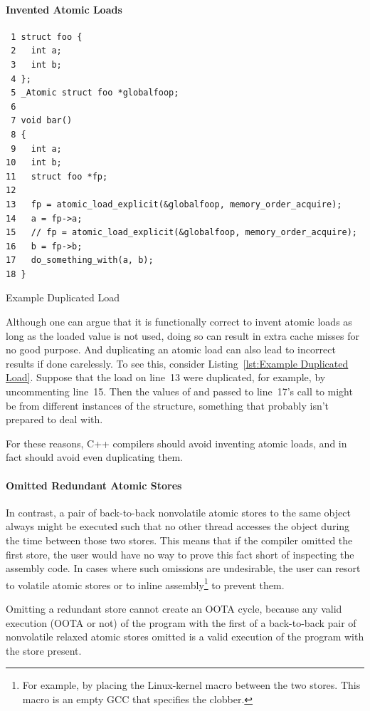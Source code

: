 \documentclass[10]{article}
\begin{document}
\paragraph{Invented Atomic Loads}
\begin{listing}[tbp]
\scriptsize
\begin{verbatim}
 1 struct foo {
 2   int a;
 3   int b;
 4 };
 5 _Atomic struct foo *globalfoop;
 6
 7 void bar()
 8 {
 9   int a;
10   int b;
11   struct foo *fp;
12
13   fp = atomic_load_explicit(&globalfoop, memory_order_acquire);
14   a = fp->a;
15   // fp = atomic_load_explicit(&globalfoop, memory_order_acquire);
16   b = fp->b;
17   do_something_with(a, b);
18 }
\end{verbatim}
\caption{Example Duplicated Load}
\label{lst:Example Duplicated Load}
\end{listing}
Although one can argue that it is functionally correct to invent atomic
loads as long as the loaded value is not used, doing so can result in
extra cache misses for no good purpose.
And duplicating an atomic load can also lead to incorrect results if done
carelessly.
To see this, consider
Listing~\ref{lst:Example Duplicated Load}.
Suppose that the load on line~13 were duplicated, for example, by
uncommenting line~15.
Then the values of  and  passed to line~17's call to
 might be from different instances of the
 structure, something that  probably
isn't prepared to deal with.

For these reasons, C++ compilers should avoid inventing atomic
loads, and in fact should avoid even duplicating them.

\paragraph{Omitted Redundant Atomic Stores}
In contrast, a pair of back-to-back nonvolatile atomic stores to the
same object
always might be executed such that no other thread accesses the object
during the time between those two stores.
This means that if the compiler omitted the first store,
the user would have no way to prove this fact short of
inspecting the assembly code.
In cases where such omissions are undesirable, the user can resort to
volatile atomic stores or to inline assembly\footnote{
	For example, by placing the Linux-kernel  macro
	between the two stores.
	This macro is an empty GCC  that specifies the 
	clobber.}
to prevent them.

Omitting a redundant store cannot create an OOTA cycle,
because any valid execution (OOTA or not)
of the program with the first of a back-to-back pair of nonvolatile
relaxed atomic stores omitted is a valid execution of the
program with the store present.
\end{document}
